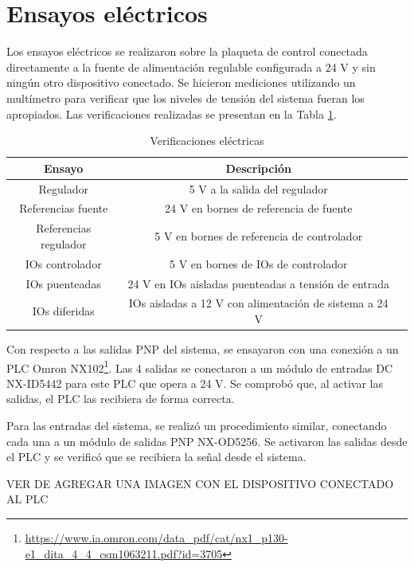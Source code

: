 \section{Ensayos eléctricos}

Los ensayos eléctricos se realizaron sobre la plaqueta de control conectada directamente a la fuente de alimentación regulable configurada a 24 V y sin ningún otro dispositivo conectado. Se hicieron mediciones utilizando un multímetro para verificar que los niveles de tensión del sistema fueran los apropiados. Las verificaciones realizadas se presentan en la Tabla \ref{tab:verificaciones_electricas}.

\begin{table}[h]
	\centering
	\caption[Verificaciones eléctricas]{Verificaciones eléctricas}
	\begin{tabular}{c c c}    
		\toprule
		\textbf{Ensayo} 	 & 		\textbf{Descripción} \\
		\midrule
		Regulador & 5 V a la salida del regulador\\
		Referencias fuente & 24 V en bornes de referencia de fuente \\
		Referencias regulador & 5 V en bornes de referencia de controlador \\
		IOs controlador & 5 V en bornes de IOs de controlador \\		
		IOs puenteadas 	& 24 V en IOs aisladas puenteadas a tensión de entrada \\
		IOs	diferidas	& IOs aisladas a 12 V con alimentación de sistema a 24 V \\
		\bottomrule
		\hline
	\end{tabular}
	\label{tab:verificaciones_electricas}
\end{table} 

Con respecto a las salidas PNP del sistema, se ensayaron con una conexión a un PLC Omron NX102\footnote{\url{https://www.ia.omron.com/data_pdf/cat/nx1_p130-e1_dita_4_4_csm1063211.pdf?id=3705}}. Las 4 salidas se conectaron a un módulo de entradas DC NX-ID5442 para este PLC que opera a 24 V. Se comprobó que, al activar las salidas, el PLC las recibiera de forma correcta.

Para las entradas del sistema, se realizó un procedimiento similar, conectando cada una a un módulo de salidas PNP NX-OD5256. Se activaron las salidas desde el PLC y se verificó que se recibiera la señal desde el sistema.

VER DE AGREGAR UNA IMAGEN CON EL DISPOSITIVO CONECTADO AL PLC

